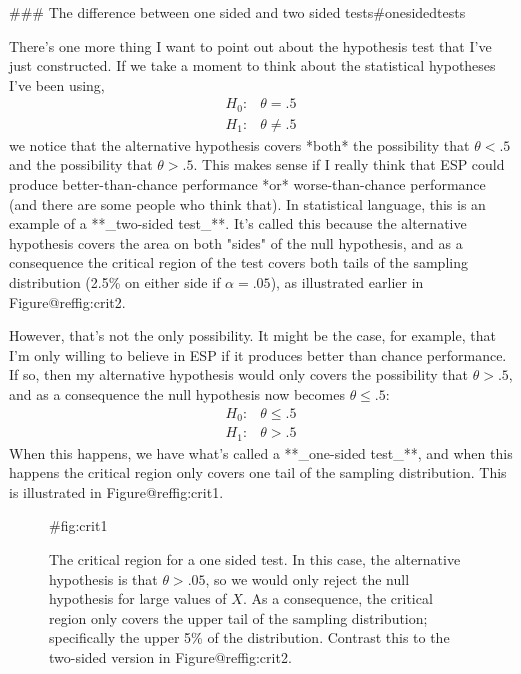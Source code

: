 ### The difference between one sided and two sided tests{#onesidedtests}


There's one more thing I want to point out about the hypothesis test that I've just constructed. If we take a moment to think about the statistical hypotheses I've been using, 
$$
\begin{array}{cc}
H_0 : & \theta = .5 \\
H_1 : & \theta \neq .5 
\end{array}
$$
we notice that the alternative hypothesis covers *both* the possibility that $\theta < .5$ and the possibility that $\theta > .5$. This makes sense if I really think that ESP could produce better-than-chance performance *or* worse-than-chance performance (and there are some people who think that). In statistical language, this is an example of a **_two-sided test_**. It's called this because the alternative hypothesis covers the area on both "sides" of the null hypothesis, and as a consequence the critical region of the test covers both tails of the sampling distribution (2.5\% on either side if $\alpha =.05$), as illustrated earlier in Figure@reffig:crit2. 

However, that's not the only possibility. It might be the case, for example, that I'm only willing to believe in ESP if it produces better than chance performance. If so, then my alternative hypothesis would only covers the possibility that $\theta > .5$, and as a consequence the null hypothesis now becomes $\theta \leq .5$:
$$
\begin{array}{cc}
H_0 : & \theta \leq .5 \\
H_1 : & \theta > .5 
\end{array}
$$
When this happens, we have what's called a **_one-sided test_**, and when this happens the critical region only covers one tail of the sampling distribution. This is illustrated in Figure@reffig:crit1.

\begin{figure}
\begin{center}
\caption{The critical region for a one sided test. In this case, the alternative hypothesis is that $\theta > .05$, so we would only reject the null hypothesis for large values of $X$. As a consequence, the critical region only covers the upper tail of the sampling distribution; specifically the upper 5\% of the distribution. Contrast this to the two-sided version in Figure@reffig:crit2. }
\HR
{#fig:crit1}
\end{center}
\end{figure}


